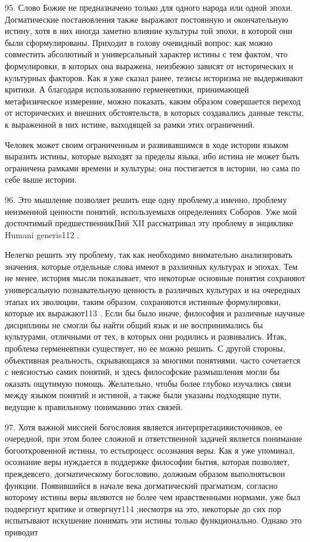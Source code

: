 \documentclass[a5paper,10pt]{article}
\begin{document}
95. Слово Божие не предназначено только для одного народа или одной эпохи.
Догматические постановления также выражают постоянную и окончательную истину,
хотя в них иногда заметно влияние культуры той эпохи, в которой они были
сформулированы. Приходит в голову очевидный вопрос: как можно совместить
абсолютный и универсальный характер истины с тем фактом, что формулировки, в
которых она выражена, неизбежно зависят от исторических и культурных факторов.
Как я уже сказал ранее, тезисы историзма не выдерживают критики. А благодаря
использованию герменевтики, принимающей метафизическое измерение, можно
показать, каким образом совершается переход от исторических и внешних
обстоятельств, в которых создавались данные тексты, к выраженной в них истине,
выходящей за рамки этих ограничений.

Человек может своим ограниченным и развивавшимся в ходе истории языком выразить
истины, которые выходят за пределы языка, ибо истина не может быть ограничена
рамками времени и культуры; она постигается в истории, но сама по себе выше
истории.

96. Это мышление позволяет решить еще одну проблему,а именно, проблему
неизменной ценности понятий, используемыхв определениях Соборов. Уже мой
досточтимый предшественникПий XII рассматривал эту проблему в энциклике Humani
generis112 .

Нелегко решить эту проблему, так как необходимо внимательно анализировать
значения, которые отдельные слова имеют в различных культурах и эпохах. Тем не
менее, история мысли показывает, что некоторые основные понятия сохраняют
универсальную познавательную ценность в различных культурах и на очередных
этапах их эволюции, таким образом, сохраняются истинные формулировки, которые
их выражают113 . Если бы было иначе, философия и различные научные дисциплины
не смогли бы найти общий язык и не воспринимались бы культурами, отличными от
тех, в которых они родились и развивались. Итак, проблема герменевтики
существует, но ее можно решить. С другой стороны, объективная реальность,
скрывающаяся за многими понятиями, часто сочетается с неясностью самих понятий,
и здесь философские размышления могли бы оказать ощутимую помощь. Желательно,
чтобы более глубоко изучались связи между языком понятий и истиной, а также
были указаны подходящие пути, ведущие к правильному пониманию этих связей.

97. Хотя важной миссией богословия является интерпретацияисточников, ее
очередной, при этом более сложной и ответственной задачей является понимание
богооткровенной истины, то естьпроцесс осознания веры. Как я уже упоминал,
осознание веры нуждается в поддержке философии бытия, которая позволяет,
преждевсего, догматическому богословию, должным образом выполнятьсвои функции.
Появившийся в начале века догматический прагматизм, согласно которому истины
веры являются не более чем нравственными нормами, уже был подвергнут критике и
отвергнут114 ;несмотря на это, некоторые до сих пор испытывают искушение
понимать эти истины только функционально. Однако это приводит
\end{document}
